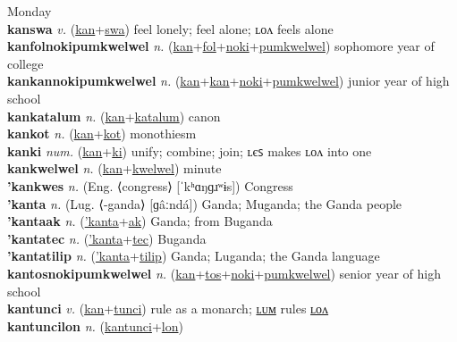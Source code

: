 Monday \label{kansunkwelwel} \\
\textbf{kanswa} \textit{v.} (\hyperref[kan]{kan}+\hyperref[swa]{swa})
feel lonely; feel alone; ʟᴏᴧ feels alone \label{kanswa} \\
\textbf{kanfolnokipumkwelwel} \textit{n.} (\hyperref[kan]{kan}+\hyperref[fol]{fol}+\hyperref[noki]{noki}+\hyperref[pumkwelwel]{pumkwelwel})
sophomore year of college \label{kanfolnokipumkwelwel} \\
\textbf{kankannokipumkwelwel} \textit{n.} (\hyperref[kan]{kan}+\hyperref[kan]{kan}+\hyperref[noki]{noki}+\hyperref[pumkwelwel]{pumkwelwel})
junior year of high school \label{kankannokipumkwelwel} \\
\textbf{kankatalum} \textit{n.} (\hyperref[kan]{kan}+\hyperref[katalum]{katalum})
canon \label{kankatalum} \\
\textbf{kankot} \textit{n.} (\hyperref[kan]{kan}+\hyperref[kot]{kot})
monothiesm \label{kankot} \\
\textbf{kanki} \textit{num.} (\hyperref[kan]{kan}+\hyperref[ki]{ki})
unify; combine; join; ʟєꜱ makes ʟᴏᴧ into one \label{kanki} \\
\textbf{kankwelwel} \textit{n.} (\hyperref[kan]{kan}+\hyperref[kwelwel]{kwelwel})
minute \label{kankwelwel} \\
\textbf{'kankwes} \textit{n.} (Eng. ⟨congress⟩ [ˈkʰɑŋɡɹʷɨs])
Congress \label{'kankwes} \\
\textbf{'kanta} \textit{n.} (Lug. ⟨-ganda⟩ [ɡâːndá])
Ganda; Muganda; the Ganda people \label{'kanta} \\
\textbf{'kantaak} \textit{n.} (\hyperref['kanta]{'kanta}+\hyperref[ak]{ak})
Ganda; from Buganda \label{'kantaak} \\
\textbf{'kantatec} \textit{n.} (\hyperref['kanta]{'kanta}+\hyperref[tec]{tec})
Buganda \label{'kantatec} \\
\textbf{'kantatilip} \textit{n.} (\hyperref['kanta]{'kanta}+\hyperref[tilip]{tilip})
Ganda; Luganda; the Ganda language \label{'kantatilip} \\
\textbf{kantosnokipumkwelwel} \textit{n.} (\hyperref[kan]{kan}+\hyperref[tos]{tos}+\hyperref[noki]{noki}+\hyperref[pumkwelwel]{pumkwelwel})
senior year of high school \label{kantosnokipumkwelwel} \\
\textbf{kantunci} \textit{v.} (\hyperref[kan]{kan}+\hyperref[tunci]{tunci})
rule as a monarch; \hyperref[kantuncilum]{ʟᴜᴍ} rules \hyperref[kantuncilon]{ʟᴏᴧ} \label{kantunci} \\
\textbf{kantuncilon} \textit{n.} (\hyperref[kantunci]{kantunci}+\hyperref[lon]{lon})
